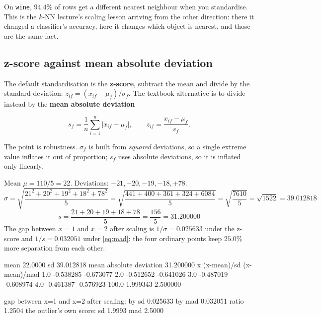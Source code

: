 \documentclass[11pt]{article}
\begin{document}
On \texttt{wine}, $94.4\%$ of rows get a different nearest neighbour when you
standardise. This is the $k$-NN lecture's scaling lesson arriving from the
other direction: there it changed a classifier's accuracy, here it changes
which object is nearest, and those are the same fact.

\subsection{z-score against mean absolute deviation}

The default standardisation is the \textbf{z-score}, subtract the mean and
divide by the standard deviation:
$z_{if} = (x_{if} - \mu_f)/\sigma_f$. The textbook alternative is to divide
instead by the \textbf{mean absolute deviation}

\begin{equation}
  s_f = \frac{1}{n}\sum_{i=1}^{n} \big| x_{if} - \mu_f \big|,
  \qquad
  z_{if} = \frac{x_{if} - \mu_f}{s_f}.
  \label{eq:mad}
\end{equation}

The point is robustness. $\sigma_f$ is built from \emph{squared} deviations,
so a single extreme value inflates it out of proportion; $s_f$ uses absolute
deviations, so it is inflated only linearly.

\begin{worked}[$x = 1, 2, 3, 4, 100$]
Mean $\mu = 110/5 = 22$. Deviations: $-21, -20, -19, -18, +78$.
\[
  \sigma = \sqrt{\frac{21^2 + 20^2 + 19^2 + 18^2 + 78^2}{5}}
  = \sqrt{\frac{441+400+361+324+6084}{5}} = \sqrt{\frac{7610}{5}}
  = \sqrt{1522} = 39.012818
\]
\[
  s = \frac{21+20+19+18+78}{5} = \frac{156}{5} = 31.200000
\]
The gap between $x=1$ and $x=2$ after scaling is $1/\sigma = 0.025633$ under
the z-score and $1/s = 0.032051$ under \eqref{eq:mad}: the four ordinary
points keep $25.0\%$ more separation from each other.
\end{worked}

\begin{codeout}
mean 22.0000    sd 39.012818    mean absolute deviation 31.200000
         x    (x-mean)/sd   (x-mean)/mad
       1.0      -0.538285      -0.673077
       2.0      -0.512652      -0.641026
       3.0      -0.487019      -0.608974
       4.0      -0.461387      -0.576923
     100.0       1.999343       2.500000

gap between x=1 and x=2 after scaling:
  by sd  0.025633       by mad  0.032051       ratio 1.2504
the outlier's own score:  sd 1.9993   mad 2.5000
\end{codeout}
\end{document}
